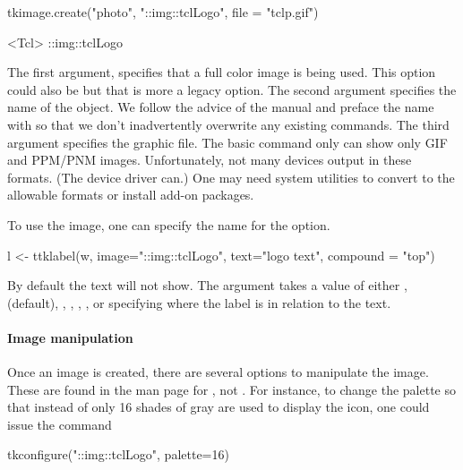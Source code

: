 \begin{Schunk}
\begin{Sinput}
 tkimage.create("photo", "::img::tclLogo", file = "tclp.gif")
\end{Sinput}
\begin{Soutput}
<Tcl> ::img::tclLogo 
\end{Soutput}
\end{Schunk}


The first argument,  specifies that a full color image is
being used. This option could also be  but that is more
a legacy option. The second argument specifies the name of the
object. We follow the advice of the \TK\/ manual and preface the name
with  so that we don't inadvertently overwrite any
existing \TCL\/ commands. The third argument
 specifies the graphic file. The basic
\TK\/  command only can show only GIF and PPM/PNM
images. Unfortunately, not many \R\/ devices output in these
formats. (The  device driver can.) One may need system
utilities to convert to the allowable formats or install add-on \TCL\/ packages.

To use the image, one can specify the name for the  option.
\begin{Schunk}
\begin{Sinput}
 l <- ttklabel(w, image="::img::tclLogo", text="logo text", 
               compound = "top")
\end{Sinput}
\end{Schunk}

By default the text will not show. The 
argument takes a value of either , 
(default), , , , ,
or  specifying where the label is in relation to the
text.

\paragraph{Image manipulation}
Once an image is created, there are several options to manipulate the
image. These are found in the \TK\/ man page for , not
. For instance, to change the palette so that instead of
 only 16 shades of gray are used to display the icon,
one could issue the command
\begin{Schunk}
\begin{Sinput}
 tkconfigure("::img::tclLogo", palette=16)
\end{Sinput}
\end{Schunk}

